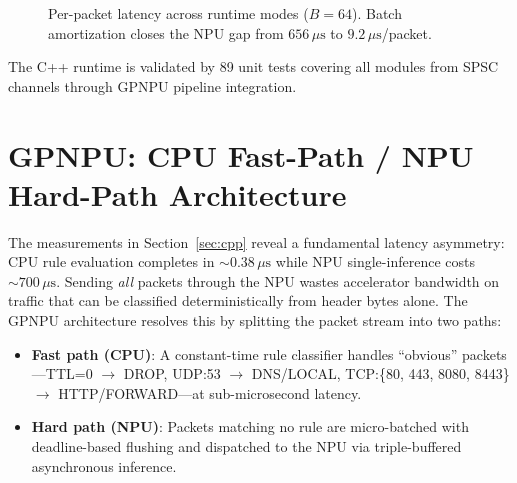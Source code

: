 \documentclass[11pt,a4paper,twoside]{article}
\theoremstyle{definition}
\theoremstyle{remark}
\begin{document}
\begin{figure}[H]
\centering
{}
\caption{Per-packet latency across runtime modes ($B = 64$). Batch amortization closes the NPU gap from $656\,\mu\text{s}$ to $9.2\,\mu\text{s}$/packet.}
\label{fig:cpp-latency}
\end{figure}

The C++ runtime is validated by 89 unit tests covering all modules from SPSC channels through GPNPU pipeline integration.


\section{GPNPU: CPU Fast-Path / NPU Hard-Path Architecture}
\label{sec:gpnpu}

The measurements in Section~\ref{sec:cpp} reveal a fundamental latency asymmetry: CPU rule evaluation completes in ${\sim}0.38\,\mu\text{s}$ while NPU single-inference costs ${\sim}700\,\mu\text{s}$. Sending \emph{all} packets through the NPU wastes accelerator bandwidth on traffic that can be classified deterministically from header bytes alone. The GPNPU architecture resolves this by splitting the packet stream into two paths:

\begin{itemize}[leftmargin=*]
  \item \textbf{Fast path (CPU)}: A constant-time rule classifier handles ``obvious'' packets---TTL=0 $\to$ DROP, UDP:53 $\to$ DNS/LOCAL, TCP:\{80, 443, 8080, 8443\} $\to$ HTTP/FORWARD---at sub-microsecond latency.
  \item \textbf{Hard path (NPU)}: Packets matching no rule are micro-batched with deadline-based flushing and dispatched to the NPU via triple-buffered asynchronous inference.
\end{itemize}
\end{document}
